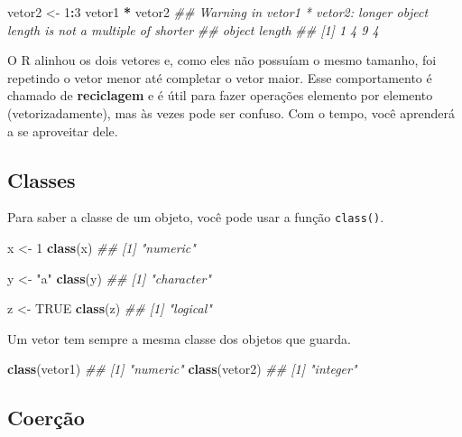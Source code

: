 \documentclass[
]{book}
\newenvironment{Shaded}{\begin{snugshade}}{\end{snugshade}}
\newcommand{\CommentTok}[1]{\textcolor[rgb]{0.56,0.35,0.01}{\textit{#1}}}
\newcommand{\DecValTok}[1]{\textcolor[rgb]{0.00,0.00,0.81}{#1}}
\newcommand{\KeywordTok}[1]{\textcolor[rgb]{0.13,0.29,0.53}{\textbf{#1}}}
\newcommand{\NormalTok}[1]{#1}
\newcommand{\OperatorTok}[1]{\textcolor[rgb]{0.81,0.36,0.00}{\textbf{#1}}}
\newcommand{\OtherTok}[1]{\textcolor[rgb]{0.56,0.35,0.01}{#1}}
\newcommand{\StringTok}[1]{\textcolor[rgb]{0.31,0.60,0.02}{#1}}
\begin{document}
\begin{Shaded}
\begin{Highlighting}[]
\NormalTok{vetor2 <-}\StringTok{ }\DecValTok{1}\OperatorTok{:}\DecValTok{3}
\NormalTok{vetor1 }\OperatorTok{*}\StringTok{ }\NormalTok{vetor2}
\CommentTok{## Warning in vetor1 * vetor2: longer object length is not a multiple of shorter}
\CommentTok{## object length}
\CommentTok{## [1] 1 4 9 4}
\end{Highlighting}
\end{Shaded}

O R alinhou os dois vetores e, como eles não possuíam o mesmo tamanho, foi repetindo o vetor menor até completar o vetor maior. Esse comportamento é chamado de \textbf{reciclagem} e é útil para fazer operações elemento por elemento (vetorizadamente), mas às vezes pode ser confuso. Com o tempo, você aprenderá a se aproveitar dele.

\hypertarget{classes}{%
\subsection{Classes}\label{classes}}

Para saber a classe de um objeto, você pode usar a função \texttt{class()}.

\begin{Shaded}
\begin{Highlighting}[]
\NormalTok{x <-}\StringTok{ }\DecValTok{1}
\KeywordTok{class}\NormalTok{(x)}
\CommentTok{## [1] "numeric"}

\NormalTok{y <-}\StringTok{ "a"}
\KeywordTok{class}\NormalTok{(y)}
\CommentTok{## [1] "character"}

\NormalTok{z <-}\StringTok{ }\OtherTok{TRUE}
\KeywordTok{class}\NormalTok{(z)}
\CommentTok{## [1] "logical"}
\end{Highlighting}
\end{Shaded}

Um vetor tem sempre a mesma classe dos objetos que guarda.

\begin{Shaded}
\begin{Highlighting}[]
\KeywordTok{class}\NormalTok{(vetor1)}
\CommentTok{## [1] "numeric"}
\KeywordTok{class}\NormalTok{(vetor2)}
\CommentTok{## [1] "integer"}
\end{Highlighting}
\end{Shaded}

\hypertarget{coeruxe7uxe3o}{%
\subsection{Coerção}\label{coeruxe7uxe3o}}
\end{document}
